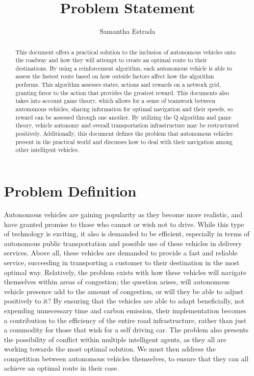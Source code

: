 \documentclass[letterpaper,10pt,draftclsnofoot,onecolumn]{IEEEtran} %
\begin{document}
\author{Samantha Estrada}
\title{Problem Statement}
\maketitle

 \begin{abstract}
      This document offers a practical solution to the inclusion of autonomous vehicles onto the roadway and how they will attempt to create an optimal route to their destinations. By using a reinforcement algorithm, each autonomous vehicle is able to assess the fastest route based on how outside factors affect how the algorithm performs. This algorithm assesses states, actions and rewards on a network grid, granting favor to the action that provides the greatest reward. This documents also takes into account game theory, which allows for a sense of teamwork between autonomous vehicles, sharing information for optimal navigation and their speeds, so reward can be assessed through one another. By utilizing the Q algorithm and game theory, vehicle autonomy and overall transportation infrastructure may be restructured positively. Additionally, this document defines the problem that autonomous vehicles present in the practical world and discusses how to deal with their navigation among other intelligent vehicles.	
 \end{abstract}

\pagebreak

\section{Problem Definition}
Autonomous vehicles are gaining popularity as they become more realistic, and have granted promise to those who cannot or wish not to drive. While this type of technology is exciting, it also is demanded to be efficient, especially in terms of autonomous public transportation and possible use of these vehicles in delivery services. Above all, these vehicles are demanded to provide a fast and reliable service, succeeding in transporting a customer to their destination in the most optimal way. Relatively, the problem exists with how these vehicles will navigate themselves within areas of congestion; the question arises, will autonomous vehicle presence add to the amount of congestion, or will they be able to adjust positively to it? By ensuring that the vehicles are able to adapt beneficially, not expending unnecessary time and carbon emission, their implementation becomes a contribution to the efficiency of the entire road infrastructure, rather than just a commodity for those that wish for a self driving car. The problem also presents the possibility of conflict within multiple intelligent agents, as they all are working towards the most optimal solution. We must then address the competition between autonomous vehicles themselves, to ensure that they can all achieve an optimal route in their case.
\end{document}
